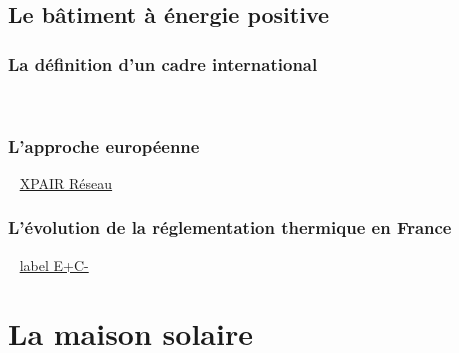 \subsection{Le bâtiment à énergie positive} %
\label{sub:le_batiment_a_energie_positive}


\subsubsection{La définition d’un cadre international} %
\label{ssub:la_definition_d_un_cadre_international}
~


\subsubsection{L’approche européenne} %
\label{ssub:l_approche_europeenne}
~
\href{http://tinyurl.com/y7uqfe8r}{XPAIR Réseau}


\subsubsection{L’évolution de la réglementation thermique en France} %
\label{ssub:l_evolution_de_la_reglementation_thermique_en_france}
~
\href{http://tinyurl.com/yb9u6adg}{label E+C-}





\section{La maison solaire} %
\label{sec:la_maison_solaire}
